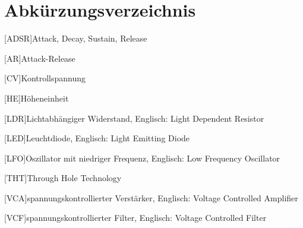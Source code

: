 
\chapter{Abkürzungsverzeichnis}

\begin{acronym}
[ADSR]{Attack, Decay, Sustain, Release}
\end{acronym}

\begin{acronym}
[AR]{Attack-Release}
\end{acronym}

\begin{acronym}
[CV]{Kontrollspannung}
\end{acronym}

\begin{acronym}
[HE]{Höheneinheit}
\end{acronym}

\begin{acronym}
[LDR]{Lichtabhängiger Widerstand, Englisch: Light Dependent Resistor}
\end{acronym}

\begin{acronym}
[LED]{Leuchtdiode, Englisch: Light Emitting Diode}
\end{acronym}

\begin{acronym}
[LFO]{Oszillator mit niedriger Frequenz, Englisch: Low Frequency Oscillator}
\end{acronym}

\begin{acronym}
[THT]{Through Hole Technology}
\end{acronym}

\begin{acronym}
[VCA]{spannungskontrollierter Verstärker, Englisch: Voltage Controlled Amplifier}
\end{acronym}

\begin{acronym}
[VCF]{spannungskontrollierter Filter, Englisch: Voltage Controlled Filter}
\end{acronym}
